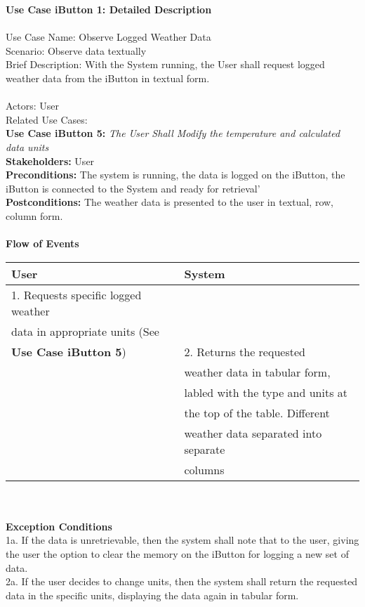 \documentclass[letterpaper]{article}
\begin{document}
\noindent
\textbf{Use Case iButton 1:  Detailed Description}\\\\
Use Case Name:  Observe Logged Weather Data\\
Scenario: Observe data textually\\
Brief Description:  With the System running, the User shall request
logged weather data from the iButton in textual form.\\\\
Actors:  User\\
Related Use Cases:\\
\textbf{Use Case iButton 5:  }\emph{The User Shall Modify the
temperature and calculated data units}\\
\textbf{Stakeholders: }User\\
\textbf{Preconditions:  }The system is running, the data is logged
on the iButton, the iButton is connected to the System and ready
for retrieval'\\
\textbf{Postconditions:  }The weather data is presented to the user
in textual, row, column form.\\\\
\textbf{Flow of Events}\\
\begin{tabular}{|l|l|}\hline
\textbf{User} & \textbf{System}\\\hline
1.  Requests specific logged weather & \\
data in appropriate units (See & \\
\textbf{Use Case iButton 5}) & 2.  Returns the requested\\
 & weather data in tabular form,\\
 & labled with the type and units at\\
 & the top of the table.  Different\\
 & weather data separated into separate\\
 & columns\\\hline
\end{tabular}\\\\
\textbf{Exception Conditions}\\
1a.  If the data is unretrievable, then the system shall note that
to the user, giving the user the option to clear the memory on the
iButton for logging a new set of data.\\
2a.  If the user decides to change units, then the system shall
return the requested data in the specific units, displaying the
data again in tabular form.
\end{document}
